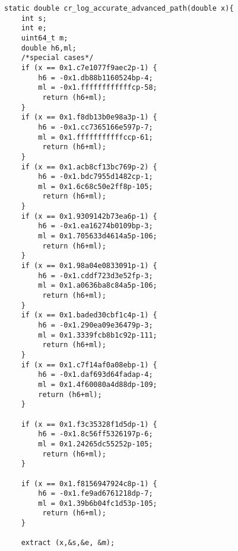\begin{lstlisting}
static double cr_log_accurate_advanced_path(double x){
    int s;
    int e;
    uint64_t m;
    double h6,ml;
    /*special cases*/
    if (x == 0x1.c7e1077f9aec2p-1) {
        h6 = -0x1.db88b1160524bp-4;
        ml = -0x1.ffffffffffffcp-58;
         return (h6+ml);
    }
    if (x == 0x1.f8db13b0e98a3p-1) {
        h6 = -0x1.cc7365166e597p-7;
        ml = 0x1.fffffffffffccp-61;
         return (h6+ml);
    }
    if (x == 0x1.acb8cf13bc769p-2) {
        h6 = -0x1.bdc7955d1482cp-1;
        ml = 0x1.6c68c50e2ff8p-105;
         return (h6+ml);
    }
    if (x == 0x1.9309142b73ea6p-1) {
        h6 = -0x1.ea16274b0109bp-3;
        ml = 0x1.705633d4614a5p-106;
         return (h6+ml);
    }
    if (x == 0x1.98a04e0833091p-1) {
        h6 = -0x1.cddf723d3e52fp-3;
        ml = 0x1.a0636ba8c84a5p-106;
         return (h6+ml);
    }
    if (x == 0x1.baded30cbf1c4p-1) {
        h6 = -0x1.290ea09e36479p-3;
        ml = 0x1.3339fcb8b1c92p-111;
         return (h6+ml);
    }
    if (x == 0x1.c7f14af0a08ebp-1) {
        h6 = -0x1.daf693d64fadap-4;
        ml = 0x1.4f60080a4d88dp-109;
        return (h6+ml);
    }

    if (x == 0x1.f3c35328f1d5dp-1) {
        h6 = -0x1.8c56ff5326197p-6;
        ml = 0x1.24265dc55252p-105;
         return (h6+ml);
    }

    if (x == 0x1.f8156947924c8p-1) {
        h6 = -0x1.fe9ad6761218dp-7;
        ml = 0x1.39b6b04fc1d53p-105;
         return (h6+ml);
    }

    extract (x,&s,&e, &m);
    

\end{lstlisting}
